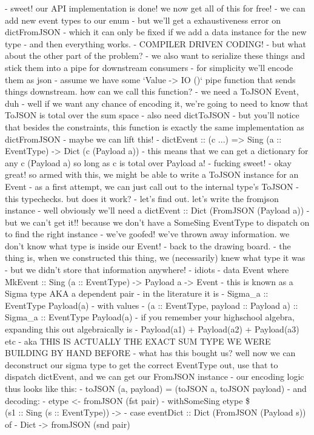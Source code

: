 - sweet! our API implementation is done! we now get all of this for free!
  - we can add new event types to our enum
  - but we'll get a exhaustiveness error on dictFromJSON
  - which it can only be fixed if we add a data instance for the new type
  - and then everything works.
  - COMPILER DRIVEN CODING!
- but what about the other part of the problem?
  - we also want to serialize these things and stick them into a pipe for downstream consumers
  - for simplicity we'll encode them as json
  - assume we have some `Value -> IO ()` pipe function that sends things downstream. how can we call this function?
    - we need a ToJSON Event, duh
    - well if we want any chance of encoding it, we're going to need to know that ToJSON is total over the sum space
    - also need dictToJSON
  - but you'll notice that besides the constraints, this function is exactly the same implementation as dictFromJSON
    - maybe we can lift this!
      - dictEvent :: (c ...) => Sing (a :: EventType) -> Dict (c (Payload a))
    - this means that we can get a dictionary for any c (Payload a) so long as c is total over Payload a!
      - fucking sweet!
  - okay great! so armed with this, we might be able to write a ToJSON instance for an Event
    - as a first attempt, we can just call out to the internal type's ToJSON
    - this typechecks. but does it work?
    - let's find out. let's write the fromjson instance
      - well obviously we'll need a dictEvent :: Dict (FromJSON (Payload a))
      - but we can't get it!! because we don't have a SomeSing EventType to dispatch on to find the right instance
      - we've goofed! we've thrown away information. we don't know what type is inside our Event!
- back to the drawing board.
  - the thing is, when we constructed this thing, we (necessarily) knew what type it was
    - but we didn't store that information anywhere!
    - idiots
  - data Event where MkEvent :: Sing (a :: EventType) -> Payload a -> Event
  - this is known as a Sigma type AKA a dependent pair
    - in the literature it is
    - Sigma_{a :: EventType} Payload(a)
      - with values
      - (a :: EventType, payload :: Payload a) :: Sigma_{a :: EventType} Payload(a)
    - if you remember your highschool algebra, expanding this out algebraically is
    - Payload(a1) + Payload(a2) + Payload(a3) etc
    - aka THIS IS ACTUALLY THE EXACT SUM TYPE WE WERE BUILDING BY HAND BEFORE
  - what has this bought us? well now we can deconstruct our sigma type to get the correct EventType out, use that to dispatch dictEvent, and we can get our FromJSON instance
  - our encoding logic thus looks like this:
    - toJSON (a, payload) = (toJSON a, toJSON payload)
  - and decoding:
    - etype <- fromJSON (fst pair)
    - withSomeSing etype \$ \\(s1 :: Sing (s :: EventType)) ->
      - case eventDict :: Dict (FromJSON (Payload s)) of
        - Dict -> fromJSON (snd pair)

